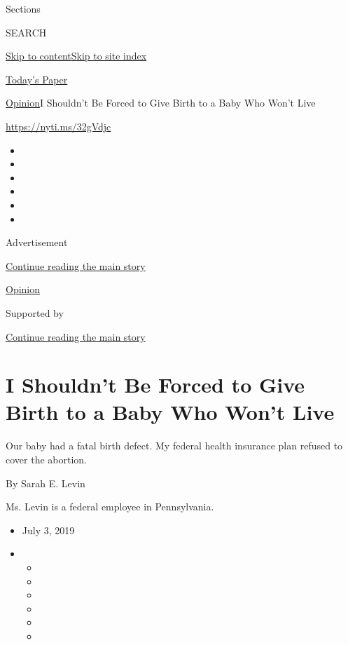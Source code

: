 Sections

SEARCH

\protect\hyperlink{site-content}{Skip to
content}\protect\hyperlink{site-index}{Skip to site index}

\href{https://myaccount.nytimes.com/auth/login?response_type=cookie\&client_id=vi}{}

\href{https://www.nytimes.com/section/todayspaper}{Today's Paper}

\href{/section/opinion}{Opinion}\textbar{}I Shouldn't Be Forced to Give
Birth to a Baby Who Won't Live

\href{https://nyti.ms/32gVdjc}{https://nyti.ms/32gVdjc}

\begin{itemize}
\item
\item
\item
\item
\item
\item
\end{itemize}

Advertisement

\protect\hyperlink{after-top}{Continue reading the main story}

\href{/section/opinion}{Opinion}

Supported by

\protect\hyperlink{after-sponsor}{Continue reading the main story}

\hypertarget{i-shouldnt-be-forced-to-give-birth-to-a-baby-who-wont-live}{%
\section{I Shouldn't Be Forced to Give Birth to a Baby Who Won't
Live}\label{i-shouldnt-be-forced-to-give-birth-to-a-baby-who-wont-live}}

Our baby had a fatal birth defect. My federal health insurance plan
refused to cover the abortion.

By Sarah E. Levin

Ms. Levin is a federal employee in Pennsylvania.

\begin{itemize}
\item
  July 3, 2019
\item
  \begin{itemize}
  \item
  \item
  \item
  \item
  \item
  \item
  \end{itemize}
\end{itemize}

